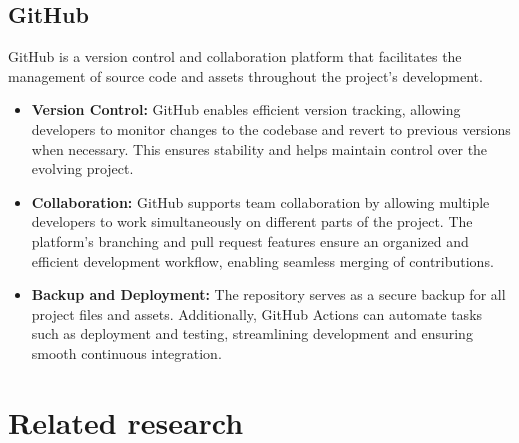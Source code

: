 \documentclass[12pt,oneside,openright,a4paper]{cpe-english-project}
\begin{document}
\subsection{GitHub}
GitHub is a version control and collaboration platform that facilitates the management of source code and assets throughout the project's development.
\begin{itemize}
\item  \textbf{Version Control:}
GitHub enables efficient version tracking, allowing developers to monitor changes to the codebase and revert to previous versions when necessary. This ensures stability and helps maintain control over the evolving project.
\item  \textbf{Collaboration:}
GitHub supports team collaboration by allowing multiple developers to work simultaneously on different parts of the project. The platform's branching and pull request features ensure an organized and efficient development workflow, enabling seamless merging of contributions.
\item  \textbf{Backup and Deployment:} 
The repository serves as a secure backup for all project files and assets. Additionally, GitHub Actions can automate tasks such as deployment and testing, streamlining development and ensuring smooth continuous integration.
\end{itemize}

\section{Related research}
\end{document}
